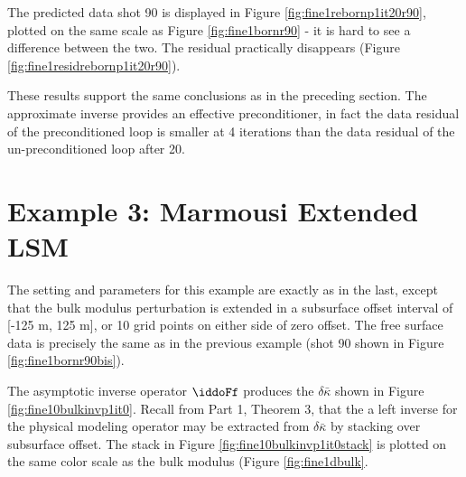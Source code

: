The predicted data shot 90 is displayed in Figure
\ref{fig:fine1rebornp1it20r90}, plotted on the same scale as Figure
\ref{fig:fine1bornr90} - it is hard to see a difference between the
two. The residual practically disappears (Figure \ref{fig:fine1residrebornp1it20r90}).



 

These results support the same conclusions as in the preceding
section. The approximate inverse provides an effective
preconditioner, in fact the data residual of the preconditioned loop is
smaller at 4 iterations than the data residual of the
un-preconditioned loop after 20.

\newpage
\section{Example 3: Marmousi Extended LSM}
The setting and parameters for this example are exactly as in the
last,  except that the bulk modulus perturbation is extended in a
subsurface offset interval of [-125 m, 125 m], or 10 grid points on
either side of zero offset. The free surface data is precisely the
same as in the previous example (shot 90 shown in Figure \ref{fig:fine1bornr90bis}).

The asymptotic inverse operator $\iddoFf$ produces the $\delta
\bar{\kappa}$ shown in Figure \ref{fig:fine10bulkinvp1it0}. Recall
from Part 1, Theorem 3, that the a left inverse for the physical
modeling operator may be extracted from $\delta \bar{\kappa} $ by
stacking over subsurface offset. The stack in Figure
\ref{fig:fine10bulkinvp1it0stack} is plotted on the same color scale
as the bulk modulus (Figure \ref{fig:fine1dbulk}.

